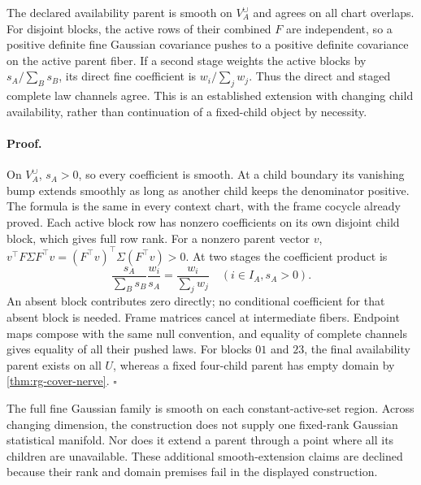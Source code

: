 The declared availability parent is smooth on \(V_A^{\cup}\) and agrees
on all chart overlaps. For disjoint blocks, the active rows of their combined
\(F\) are independent, so a positive definite fine Gaussian covariance
pushes to a positive definite covariance on the active parent fiber. If a
second stage weights the active blocks by \(s_A/\sum_Bs_B\), its direct
fine coefficient is \(w_i/\sum_jw_j\). Thus the direct and staged complete
law channels agree. This is an established extension with changing child
availability, rather than continuation of a fixed-child object by necessity.

\paragraph{Proof.}
On \(V_A^{\cup}\), \(s_A>0\), so every coefficient is smooth. At a
child boundary its vanishing bump extends smoothly as long as another child
keeps the denominator positive. The formula is the same in every context
chart, with the frame cocycle already proved. Each active block row has
nonzero coefficients on its own disjoint child block, which gives full row
rank. For a nonzero parent vector \(v\),
\(v^\top F\Sigma F^\top v=(F^\top v)^\top\Sigma(F^\top v)>0\).
At two stages the coefficient product is
\begin{equation}
 \frac{s_A}{\sum_Bs_B}\frac{w_i}{s_A}
 =\frac{w_i}{\sum_jw_j}\quad(i\in I_A, s_A>0).
\label{eq:rg-cover-staged-weights}
\end{equation}
An absent block contributes zero directly; no conditional coefficient for
that absent block is needed. Frame matrices cancel at intermediate fibers.
Endpoint maps compose with the same null convention, and equality of complete
channels gives equality of all their pushed laws. For blocks \(01\) and
\(23\), the final availability parent exists on all \(U\), whereas a
fixed four-child parent has empty domain by \cref{thm:rg-cover-nerve}.
\(\square\)

The full fine Gaussian family is smooth on each constant-active-set region.
Across changing dimension, the construction does not supply one fixed-rank
Gaussian statistical manifold. Nor does it extend a parent through a point
where all its children are unavailable. These additional smooth-extension
claims are declined because their rank and domain premises fail in the
displayed construction. 

